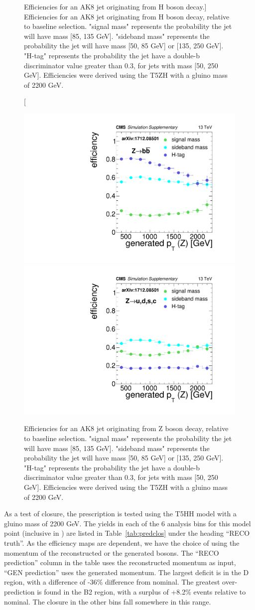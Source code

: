 \begin{figure}
\caption
[Efficiencies for an AK8 jet originating from H boson decay.]
{Efficiencies for an AK8 jet originating from H boson decay, relative to baseline selection. "signal mass" represents the probability the jet will have mass [85, 135 GeV]. "sideband mass" represents the probability the jet will have mass [50, 85 GeV] or [135, 250 GeV]. "H-tag" represents the probability the jet have a double-b discriminator value greater than 0.3, for jets with mass [50, 250 GeV]. Efficiencies were derived using the T5ZH  with a gluino mass of 2200 GeV. }
\label{fig:effH}
\end{figure}

\begin{figure}
\centering
\includegraphics[width=0.425\linewidth]{figs/CMS-SUS-17-006_Figure-aux_011.pdf}
\includegraphics[width=0.425\linewidth]{figs/CMS-SUS-17-006_Figure-aux_012.pdf}
\caption[Efficiencies for an AK8 jet originating from Z boson decay.]
{Efficiencies for an AK8 jet originating from Z boson decay, relative to baseline selection. "signal mass" represents the probability the jet will have mass  [85, 135 GeV]. "sideband mass" represents the probability the jet will have mass [50, 85 GeV] or [135, 250 GeV]. "H-tag" represents the probability the jet have a double-b discriminator value greater than 0.3, for jets with mass [50, 250 GeV]. Efficiencies were derived using the T5ZH  with a gluino mass of 2200 GeV.
}
\label{fig:effZ}
\end{figure}

As a test of closure, the prescription is tested using the T5HH model with a gluino mass of 2200 GeV. The yields in each of the 6 analysis bins for this model point (inclusive in \ptmiss) are listed in Table~\ref{tab:predclos} under the heading ``RECO truth''. As the efficiency maps are \pt dependent, we have the choice of using the momentum of the reconstructed or the generated bosons. The ``RECO prediction'' column in the table uses the reconstructed momentum as input, ``GEN prediction'' uses the generated momentum. The largest deficit is in the D region, with a difference of -36\% difference from nominal. The greatest over-prediction is found in the B2 region, with a surplus of +8.2\% events relative to nominal. The closure in the other bins fall somewhere in this range.

